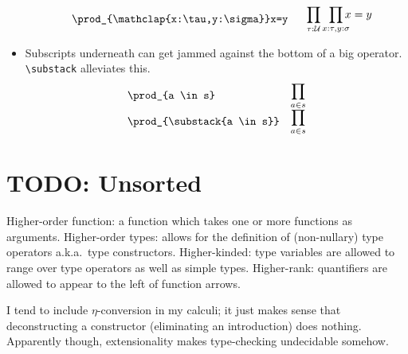 \documentclass[11pt]{article} %
\makeatletter
\newcommand\ldisplaycell[1]{\begin{array}[c]{@{}l@{}}\displaystyle {#1}\end{array}}
\theoremstyle{definition}
\theoremstyle{remark}
\makeatother
\begin{document}
\begin{itemize}
\[\begin{array}{lll}
\begin{array}[c]{@{}l@{}}
        \quad\verb/\prod_{\mathclap{x:\tau,y:\sigma}}x=y/
      \end{array} & \ldisplaycell{\;\:\,
        \prod_{\tau:\U}\;\;\prod_{\mathclap{ x:\tau,y:\sigma}}x=y } \\
  \end{array}\]
\item
  Subscripts underneath can get jammed against the bottom of a big operator.
  \verb!\substack! alleviates this.
  \[\begin{array}{lll}
    \verb/\prod_{a \in s}/ & \ldisplaycell{ \prod_{a \in s} } \\
    \verb/\prod_{\substack{a \in s}}/ & \ldisplaycell{ \prod_{\substack{a \in s}} } \\
  \end{array}\]
\end{itemize}





\part{TODO: Unsorted}


Higher-order function: a function which takes one or more functions as arguments.
Higher-order types: allows for the definition of (non-nullary) type operators a.k.a.\ type constructors.
Higher-kinded: type variables are allowed to range over type operators as well as simple types.
Higher-rank: quantifiers are allowed to appear to the left of function arrows.

I tend to include $\eta$-conversion in my calculi; it just makes sense that deconstructing a constructor (eliminating an introduction) does nothing. Apparently though, extensionality makes type-checking undecidable somehow.
\end{document}
